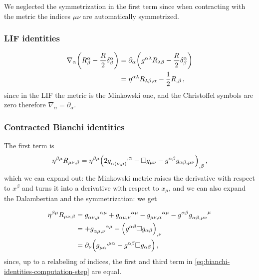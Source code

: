 \documentclass[main.tex]{subfiles}
\begin{document}
We neglected the symmetrization in the first term since when contracting with the metric the indices \(\mu \nu \) are automatically symmetrized.

\subsubsection{LIF identities}

%
\begin{subequations}
\begin{align}
  \nabla_{\alpha }\qty(R^{ \alpha }_{\beta } - \frac{R}{2} \delta^{\alpha }_{\beta }) &=  \partial_{\alpha }\qty(g^{\alpha \lambda }R_{\lambda \beta } - \frac{R}{2} \delta^{\alpha }_{\beta })  \\
  &= \eta^{\alpha \lambda }R_{\lambda \beta, \alpha} - \frac{1}{2} R_{,\beta } \label{eq:contracted-Bianchi-LIF}
\,,
\end{align}
\end{subequations}
%
since in the LIF the metric is the Minkowski one, and the Christoffel symbols are zero therefore \(\nabla_{\alpha }= \partial_{\alpha }\).

\subsubsection{Contracted Bianchi identities}

The first term is
%
\begin{equation}
  \eta^{\beta \mu }R_{\mu \nu, \beta } = 
  \eta^{\beta \mu }\qty(2 
  \tensor{g}{_{\alpha (\nu , \mu )}^{,\alpha }} 
  - \square g_{\mu \nu }
  - g^{\alpha \beta }g_{\alpha \beta, \mu \nu }
  )_{, \beta}
\,,
\end{equation}
%
which we can expand out: the Minkowski metric raises the derivative with respect to \(x^{\beta }\) and turns it into a derivative with respect to \(x_{\mu }\), and we can also expand the Dalambertian and the symmetrization: we get
%

%
\begin{subequations}
\begin{align}
  \eta^{\beta \mu } R_{\mu \nu , \beta } &=
  \tensor{g}{_{\alpha \nu , \mu }^{ \alpha \mu }}
  + \tensor{g}{_{\alpha \mu , \nu }^{ \alpha \mu }}
  - \tensor{g}{_{\mu \nu, \alpha }^{ \alpha \mu }}
  - g^{\alpha \beta }\tensor{g}{_{\alpha \beta , \mu \nu }^{\mu }} \label{eq:bianchi-identities-computation-step} \\
  &=   + \tensor{g}{_{\alpha \mu , \nu }^{ \alpha \mu }}
  - \qty(g^{\alpha \beta } \square g_{\alpha \beta })_{,\nu } \\
  &= \partial_{\nu }\qty( \tensor{g}{_{\mu \alpha}^{,\mu \alpha }} - g^{\alpha \beta }\square g_{\alpha \beta })
\,,
\end{align}
\end{subequations}
%
since, up to a relabeling of indices, the first and third term in \eqref{eq:bianchi-identities-computation-step} are equal.
\end{document}
